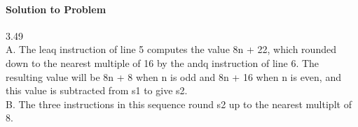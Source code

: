 \documentclass{report}
\begin{document}
\paragraph{Solution to Problem } 3.49\\
A. The leaq instruction of line 5 computes the value 8n + 22, which rounded down to the nearest multiple of 16 by the andq instruction of line 6. The resulting value will be 8n + 8 when n is odd and 8n + 16 when n is even, and this value is subtracted from s1 to give s2. \\
B. The three instructions in this sequence round s2 up to the nearest multiplt of 8. \\
\end{document}
